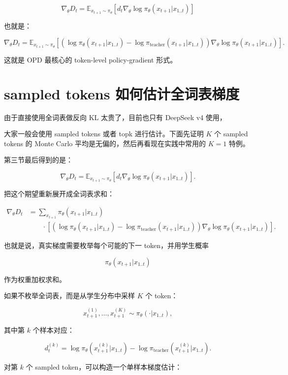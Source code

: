 \documentclass[11pt,a4paper,fontset=fandol]{ctexart}
\begin{document}
\[
\boxed{
\nabla_\theta D_t
=
\mathbb E_{x_{t+1}\sim\pi_\theta}
\left[
d_t
\nabla_\theta\log\pi_\theta(x_{t+1}|x_{1..t})
\right]
}
\]

也就是：

\[
\boxed{
\nabla_\theta D_t
=
\mathbb E_{x_{t+1}\sim\pi_\theta}
\left[
\left(
\log\pi_\theta(x_{t+1}|x_{1..t})
-
\log\pi_{\text{teacher}}(x_{t+1}|x_{1..t})
\right)
\nabla_\theta\log\pi_\theta(x_{t+1}|x_{1..t})
\right].
}
\]

这就是 OPD 最核心的 token-level policy-gradient 形式。

\section{sampled tokens 如何估计全词表梯度}

由于直接使用全词表做反向 KL 太贵了，目前也只有 DeepSeek v4 使用，

大家一般会使用 sampled tokens 或者 topk 进行估计。下面先证明 \(K\) 个 sampled tokens 的 Monte Carlo 平均是无偏的，然后再看现在实践中常用的 \(K=1\) 特例。

第三节最后得到的是：

\[
\boxed{
\nabla_\theta D_t
=
\mathbb E_{x_{t+1}\sim\pi_\theta}
\left[
d_t
\nabla_\theta\log\pi_\theta(x_{t+1}|x_{1..t})
\right].
}
\]

把这个期望重新展开成全词表求和：

\[
\begin{aligned}
\nabla_\theta D_t
&=
\sum_{x_{t+1}}
\pi_\theta(x_{t+1}|x_{1..t})\\
&\qquad\cdot
\left[
\left(
\log\pi_\theta(x_{t+1}|x_{1..t})
-
\log\pi_{\text{teacher}}(x_{t+1}|x_{1..t})
\right)
\nabla_\theta\log\pi_\theta(x_{t+1}|x_{1..t})
\right].
\end{aligned}
\]

也就是说，真实梯度需要枚举每个可能的下一 token，并用学生概率

\[
\pi_\theta(x_{t+1}|x_{1..t})
\]

作为权重加权求和。

如果不枚举全词表，而是从学生分布中采样 \(K\) 个 token：

\[
x_{t+1}^{(1)},\ldots,x_{t+1}^{(K)}
\sim
\pi_\theta(\cdot|x_{1..t}),
\]

其中第 \(k\) 个样本对应：

\[
d_t^{(k)}
=
\log\pi_\theta(x_{t+1}^{(k)}|x_{1..t})
-
\log\pi_{\text{teacher}}(x_{t+1}^{(k)}|x_{1..t}).
\]

对第 \(k\) 个 sampled token，可以构造一个单样本梯度估计：
\end{document}
